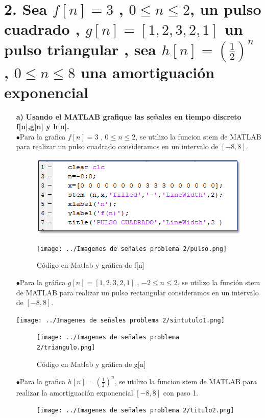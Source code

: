 \documentclass[11pt,a4paper]{article}
\begin{document}
	\section{{\large \textbf{2. Sea $f[n]=3$ , $0\leq n \leq 2$, un pulso cuadrado , $g[n]=[1,2,3,2,1]$ un pulso triangular , sea $h[n]=(\frac{1}{2})^n$ , $0\leq n\leq 8$ una amortiguación exponencial}}}{
	\large{
	\begin{enumerate}
	\item[\textbf{a)}]
	\textbf{Usando el MATLAB grafique las señales en tiempo discreto f[n],g[n] y h[n].}\\
	$ \bullet$Para la grafica $f[n]=3$ , $ 0\leq n\leq 2$, se utilizo la funcion stem de MATLAB para realizar un pulso cuadrado consideramos en un intervalo de $[-8,8]$.
\begin{figure}[h]
\centering
\includegraphics[scale=0.6]{../Imagenes de señales problema 2/Sin título.png} 
\end{figure}

\begin{figure}[h]
\centering
\texttt{[image: ../Imagenes de señales problema 2/pulso.png]} 
\caption{Código en Matlab y gráfica de f[n]} 
\label{Gráfica_fn}
\end{figure}
$\bullet$Para la gráfica $g[n]=[1,2,3,2,1]$ , $-2\leq n\leq 2$, se utilizo la función stem de MATLAB para realizar un pulso rectangular consideramos en un intervalo de $[-8,8]$.

\begin{center}
\texttt{[image: ../Imagenes de señales problema 2/sintutulo1.png]}
\end{center}

\begin{figure}[h]
\centering
\texttt{[image: ../Imagenes de señales problema 2/triangulo.png]} 
\caption{Código en Matlab y gráfica de g[n]} 
\label{Gráfica_gn}
\end{figure}
\newpage
$\bullet$Para la grafica $h[n]=(\frac{1}{2})^n$, se utilizo la funcion stem de MATLAB para realizar la amortiguación exponencial $[-8,8]$ con paso 1.
\begin{figure}[h]
\centering
\texttt{[image: ../Imagenes de señales problema 2/titulo2.png]} 
\label{Código_hn}
\end{figure}


\end{enumerate}}}
\end{document}
